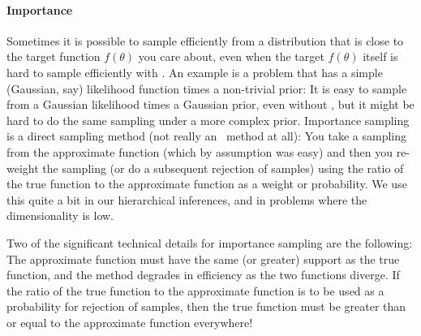 \documentclass[modern]{aastex61}
\newcommand{\MCMC}{\acronym{MCMC}}
\newcommand{\pars}{\theta}
\begin{document}
\paragraph{Importance}
Sometimes it is possible to sample efficiently from a distribution
that is close to the target function $f(\pars)$ you care about, even when the target $f(\pars)$ itself is
hard to sample efficiently with \MCMC.
An example is a problem that has a simple (Gaussian, say) likelihood
function times a non-trivial prior:
It is easy to sample from a Gaussian likelihood times a Gaussian
prior, even without \MCMC, but it might be hard to do the same sampling
under a more complex prior.
Importance sampling is a direct sampling method (not really an \MCMC\
method at all):
You take a sampling from the approximate function (which by assumption
was easy) and then you re-weight the sampling (or do a subsequent
rejection of samples) using the ratio of the true function to the
approximate function as a weight or probability.
We use this quite a bit in our hierarchical inferences,
and in problems where the dimensionality is low.\note{See, for example, \citet{joker}.}

Two of the significant technical details for importance sampling are the
following:
The approximate function must have the same (or greater) support as
the true function, and the method degrades in efficiency as the two
functions diverge.
If the ratio of the true function to the approximate function is to be
used as a probability for rejection of samples, then the true function
must be greater than or equal to the approximate function everywhere!
\end{document}
